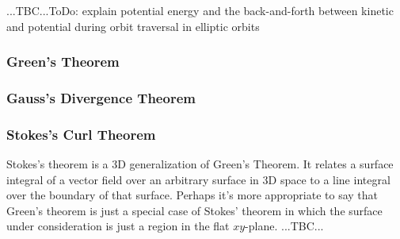 ...TBC...ToDo: explain potential energy and the back-and-forth between kinetic and potential during orbit traversal in elliptic orbits




\subsubsection{Green's Theorem}

\subsubsection{Gauss's Divergence Theorem}

\subsubsection{Stokes's Curl Theorem}
Stokes's theorem is a 3D generalization of Green's Theorem. It relates a surface integral of a vector field over an arbitrary surface in 3D space to a line integral over the boundary of that surface. Perhaps it's more appropriate to say that Green's theorem is just a special case of Stokes' theorem in which the surface under consideration is just a region in the flat $xy$-plane. ...TBC...







\begin{comment}

-make a section for how to compute potentials for a given evctor field
-before that, have a section for how to test, if a potential even exists 

-i'm not sure, if path integrals and surface integrals should be treated here or in the "General Concepts" section ...maybe here - there, we only do integrals of scalar fields


https://en.wikipedia.org/wiki/Matrix_calculus

explain this:
https://en.wikipedia.org/wiki/Helmholtz_decomposition

\end{comment}


